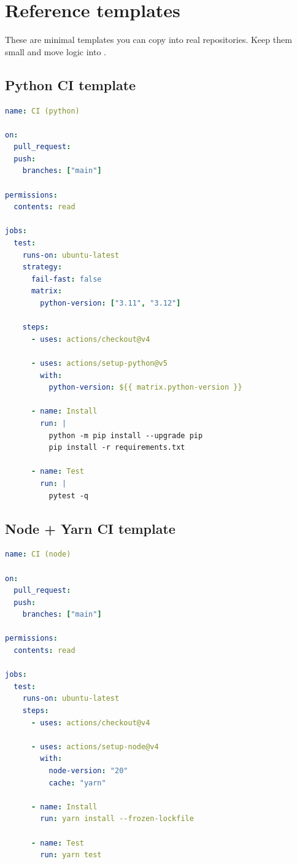 \chapter{Reference templates}

These are minimal templates you can copy into real repositories.
Keep them small and move logic into .

\section{Python CI template}
\begin{lstlisting}[language=YAML]
name: CI (python)

on:
  pull_request:
  push:
    branches: ["main"]

permissions:
  contents: read

jobs:
  test:
    runs-on: ubuntu-latest
    strategy:
      fail-fast: false
      matrix:
        python-version: ["3.11", "3.12"]

    steps:
      - uses: actions/checkout@v4

      - uses: actions/setup-python@v5
        with:
          python-version: ${{ matrix.python-version }}

      - name: Install
        run: |
          python -m pip install --upgrade pip
          pip install -r requirements.txt

      - name: Test
        run: |
          pytest -q
\end{lstlisting}

\section{Node + Yarn CI template}
\begin{lstlisting}[language=YAML]
name: CI (node)

on:
  pull_request:
  push:
    branches: ["main"]

permissions:
  contents: read

jobs:
  test:
    runs-on: ubuntu-latest
    steps:
      - uses: actions/checkout@v4

      - uses: actions/setup-node@v4
        with:
          node-version: "20"
          cache: "yarn"

      - name: Install
        run: yarn install --frozen-lockfile

      - name: Test
        run: yarn test
\end{lstlisting}

